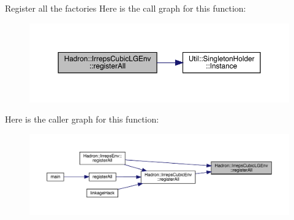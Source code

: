 Register all the factories Here is the call graph for this function\+:\nopagebreak
\begin{figure}[H]
\begin{center}
\leavevmode
\includegraphics[width=350pt]{d0/d66/namespaceHadron_1_1IrrepsCubicLGEnv_a4c9a3cd2351dacf5ec8f2f58df4b7e3a_cgraph}
\end{center}
\end{figure}
Here is the caller graph for this function\+:
\nopagebreak
\begin{figure}[H]
\begin{center}
\leavevmode
\includegraphics[width=350pt]{d0/d66/namespaceHadron_1_1IrrepsCubicLGEnv_a4c9a3cd2351dacf5ec8f2f58df4b7e3a_icgraph}
\end{center}
\end{figure}
